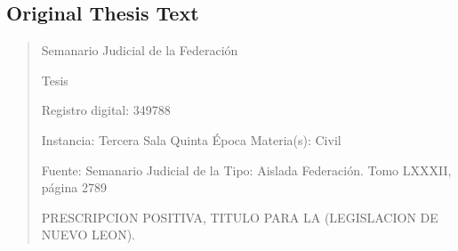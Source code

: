 \documentclass[11pt,a4paper]{article}
\begin{document}
\subsection{Original Thesis Text}

\begin{quote}
                                                   Semanario Judicial de la Federación

                                                  Tesis

 Registro digital: 349788

 Instancia: Tercera Sala           Quinta Época                            Materia(s): Civil

                                   Fuente: Semanario Judicial de la        Tipo: Aislada
                                   Federación.
                                   Tomo LXXXII, página 2789


PRESCRIPCION POSITIVA, TITULO PARA LA (LEGISLACION DE NUEVO LEON).



\end{quote}
\end{document}
